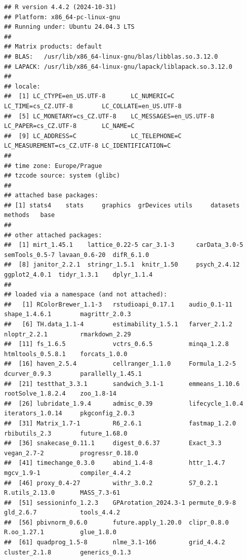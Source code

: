 \documentclass[
  10pt,
]{article}
\begin{document}
\begin{verbatim}
## R version 4.4.2 (2024-10-31)
## Platform: x86_64-pc-linux-gnu
## Running under: Ubuntu 24.04.3 LTS
## 
## Matrix products: default
## BLAS:   /usr/lib/x86_64-linux-gnu/blas/libblas.so.3.12.0 
## LAPACK: /usr/lib/x86_64-linux-gnu/lapack/liblapack.so.3.12.0
## 
## locale:
##  [1] LC_CTYPE=en_US.UTF-8       LC_NUMERIC=C               LC_TIME=cs_CZ.UTF-8        LC_COLLATE=en_US.UTF-8    
##  [5] LC_MONETARY=cs_CZ.UTF-8    LC_MESSAGES=en_US.UTF-8    LC_PAPER=cs_CZ.UTF-8       LC_NAME=C                 
##  [9] LC_ADDRESS=C               LC_TELEPHONE=C             LC_MEASUREMENT=cs_CZ.UTF-8 LC_IDENTIFICATION=C       
## 
## time zone: Europe/Prague
## tzcode source: system (glibc)
## 
## attached base packages:
## [1] stats4    stats     graphics  grDevices utils     datasets  methods   base     
## 
## other attached packages:
##  [1] mirt_1.45.1    lattice_0.22-5 car_3.1-3      carData_3.0-5  semTools_0.5-7 lavaan_0.6-20  difR_6.1.0    
##  [8] janitor_2.2.1  stringr_1.5.1  knitr_1.50     psych_2.4.12   ggplot2_4.0.1  tidyr_1.3.1    dplyr_1.1.4   
## 
## loaded via a namespace (and not attached):
##   [1] RColorBrewer_1.1-3   rstudioapi_0.17.1    audio_0.1-11         shape_1.4.6.1        magrittr_2.0.3      
##   [6] TH.data_1.1-4        estimability_1.5.1   farver_2.1.2         nloptr_2.2.1         rmarkdown_2.29      
##  [11] fs_1.6.5             vctrs_0.6.5          minqa_1.2.8          htmltools_0.5.8.1    forcats_1.0.0       
##  [16] haven_2.5.4          cellranger_1.1.0     Formula_1.2-5        dcurver_0.9.3        parallelly_1.45.1   
##  [21] testthat_3.3.1       sandwich_3.1-1       emmeans_1.10.6       rootSolve_1.8.2.4    zoo_1.8-14          
##  [26] lubridate_1.9.4      admisc_0.39          lifecycle_1.0.4      iterators_1.0.14     pkgconfig_2.0.3     
##  [31] Matrix_1.7-1         R6_2.6.1             fastmap_1.2.0        rbibutils_2.3        future_1.68.0       
##  [36] snakecase_0.11.1     digest_0.6.37        Exact_3.3            vegan_2.7-2          progressr_0.18.0    
##  [41] timechange_0.3.0     abind_1.4-8          httr_1.4.7           mgcv_1.9-1           compiler_4.4.2      
##  [46] proxy_0.4-27         withr_3.0.2          S7_0.2.1             R.utils_2.13.0       MASS_7.3-61         
##  [51] sessioninfo_1.2.3    GPArotation_2024.3-1 permute_0.9-8        gld_2.6.7            tools_4.4.2         
##  [56] pbivnorm_0.6.0       future.apply_1.20.0  clipr_0.8.0          R.oo_1.27.1          glue_1.8.0          
##  [61] quadprog_1.5-8       nlme_3.1-166         grid_4.4.2           cluster_2.1.8        generics_0.1.3      

\end{verbatim}
\end{document}
